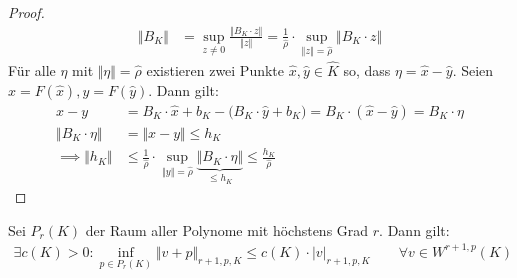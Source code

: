 \begin{proof}
	\begin{align*}
		\Vert B_K\Vert&=\sup\limits_{z\neq0}\frac{\Vert B_K \cdot z\Vert}{\Vert z\Vert}=\frac{1}{\hat{\rho}}\cdot\sup\limits_{\Vert z\Vert=\hat{\rho}}\Vert B_K \cdot z\Vert
	\end{align*}
	Für alle $\eta$ mit $\Vert \eta\Vert=\hat{\rho}$ existieren zwei Punkte $\hat{x},\hat{y}\in\hat{K}$ so, dass $\eta=\hat{x}-\hat{y}$. Seien $x=F(\hat{x}),y=F(\hat{y})$. Dann gilt:
	\begin{align*}
		x-y&=B_K\cdot\hat{x}+b_K-\big(B_K\cdot\hat{y}+b_K\big)=B_K\cdot(\hat{x}-\hat{y})=B_K \cdot \eta\\
		\Vert B_K\cdot \eta\Vert&=\Vert x-y\Vert\leq h_K\\
		\implies \Vert h_K\Vert&\leq\frac{1}{\hat{\rho}}\cdot\sup\limits_{\Vert y\Vert=\hat{\rho}}\underbrace{\Vert B_K\cdot \eta\Vert}_{\leq h_K}\leq\frac{h_K}{\hat{\rho}}
	\end{align*}
\end{proof}

\begin{lemma}\label{lemma4.11DenyLions}\enter
	Sei $P_r(K)$ der Raum aller Polynome mit höchstens Grad $r$. Dann gilt:
	\begin{align*}
		\exists c(K)>0:\inf\limits_{p\in P_r(K)}\Vert v+p\Vert_{r+1,p,K}\leq c(K)\cdot |v|_{r+1,p,K}\qquad\forall v\in W^{r+1,p}(K)
	\end{align*}
\end{lemma}

